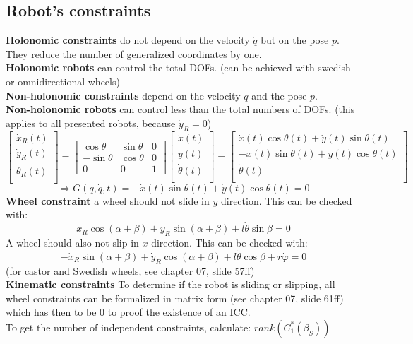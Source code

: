 \documentclass[12pt]{article}
\begin{document}
	\subsection{Robot's constraints}
	\textbf{Holonomic constraints} do not depend on the velocity $\dot{q}$ but on the pose $p$. They reduce the number of generalized coordinates by one.\\
	\textbf{Holonomic robots} can control the total DOFs. (can be achieved with swedish or omnidirectional wheels)\\
	\textbf{Non-holonomic constraints} depend on the velocity $\dot{q}$ and the pose $p$.\\
	\textbf{Non-holonomic robots} can control less than the total numbers of DOFs. (this applies to all presented robots, because $\dot{y}_R = 0$)
	$$\begin{bmatrix}
	\dot{x}_R(t)\\
	\dot{y}_R(t)\\
	\dot{\theta}_R(t)\\
	\end{bmatrix} = 
	\begin{bmatrix}
	\cos \theta & \sin \theta & 0\\
	-\sin \theta & \cos \theta & 0\\
	0 & 0 & 1
	\end{bmatrix}
	\begin{bmatrix}
	\dot{x}(t)\\
	\dot{y}(t)\\
	\dot{\theta}(t)\\
	\end{bmatrix} = 
	\begin{bmatrix}
	\dot{x}(t) \cos \theta(t) + \dot{y}(t) \sin \theta(t)\\
	-\dot{x}(t) \sin \theta(t) + \dot{y}(t) \cos \theta(t)\\
	\dot{\theta}(t)\\
	\end{bmatrix}$$
	$$\Rightarrow G(q, \dot{q}, t) = -\dot{x}(t) \sin \theta(t) + \dot{y}(t) \cos \theta(t) = 0$$
	\textbf{Wheel constraint} a wheel should not slide in $y$ direction. This can be checked with:
	$$\dot{x}_R \cos(\alpha + \beta) + \dot{y}_R \sin(\alpha + \beta) + l \dot{\theta} \sin \beta = 0$$
	A wheel should also not slip in $x$ direction. This can be checked with:
	$$-\dot{x}_R \sin(\alpha + \beta) + \dot{y}_R \cos(\alpha + \beta) + l \dot{\theta} \cos \beta + r \dot{\varphi} = 0$$
	(for castor and Swedish wheels, see chapter 07, slide 57ff)\\
	\textbf{Kinematic constraints} To determine if the robot is sliding or slipping, all wheel constraints can be formalized in matrix form (see chapter 07, slide 61ff) which has then to be 0 to proof the existence of an ICC.\\
	To get the number of independent constraints, calculate: $rank(C_1^*(\beta_S))$\\
		
\end{document}
